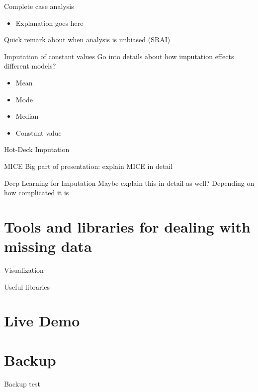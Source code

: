 \documentclass[aspectratio=43]{beamer}
\begin{document}
\begin{frame}{Complete case analysis}
\begin{itemize}
\item Explanation goes here
\end{itemize}
Quick remark about when analysis is unbiased (SRAI)
\end{frame}

\begin{frame}{Imputation of constant values}
Go into details about how imputation effects different models?
\begin{itemize}
\item Mean
\item Mode
\item Median
\item Constant value
\end{itemize}
\end{frame}

\begin{frame}{Hot-Deck Imputation}
\end{frame}

\begin{frame}{MICE}
Big part of presentation: explain MICE in detail
\end{frame}

\begin{frame}{Deep Learning for Imputation}
Maybe explain this in detail as well? Depending on how complicated it is
\end{frame}


\section{Tools and libraries for dealing with missing data}

\begin{frame}{Visualization}
\end{frame}

\begin{frame}{Useful libraries}
\end{frame}

\section{Live Demo}

\appendix
\section{Backup}

\begin{frame}{Backup}
\scriptsize
test
\normalsize
\end{frame}
\end{document}
